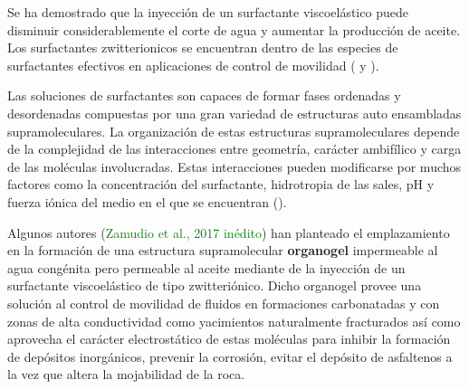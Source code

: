 Se ha demostrado que la inyección de un surfactante viscoelástico puede disminuir considerablemente el corte de agua y aumentar la producción de aceite. Los surfactantes zwitterionicos se encuentran dentro de las especies de surfactantes efectivos en aplicaciones de control de movilidad (\cite{Lakatos2007} y \cite{LaastreBuelvas2012}).

Las soluciones de surfactantes son capaces de formar fases ordenadas y desordenadas compuestas por una gran variedad de estructuras auto ensambladas supramoleculares. La organización de estas estructuras supramoleculares depende de la complejidad de las interacciones entre geometría, carácter ambifílico y carga de las moléculas involucradas. Estas interacciones pueden modificarse por muchos factores como la concentración del surfactante, hidrotropia de las sales, pH y fuerza iónica del medio en el que se encuentran (\cite{LopezDiaz2010}).

Algunos autores (\textcolor{Green}{Zamudio et al., 2017 inédito}) han planteado el emplazamiento en la formación de una estructura supramolecular \textbf{organogel} impermeable al agua congénita pero permeable al aceite mediante de la inyección de un surfactante viscoelástico de tipo zwitteriónico. Dicho organogel provee una solución al control de movilidad de fluidos en formaciones carbonatadas y con zonas de alta conductividad como yacimientos naturalmente fracturados así como aprovecha el carácter electrostático de estas moléculas para inhibir la formación de depósitos inorgánicos, prevenir la corrosión, evitar el depósito de asfaltenos a la vez que altera la mojabilidad de la roca. 

%

